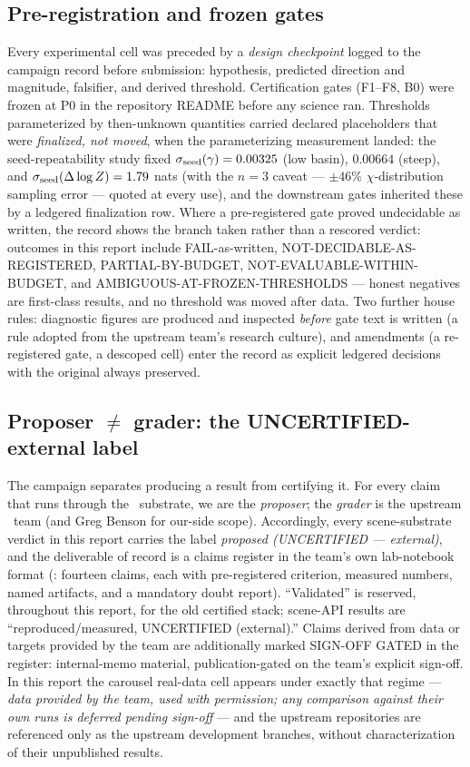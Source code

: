 \subsection{Pre-registration and frozen gates}

Every experimental cell was preceded by a \emph{design checkpoint} logged
to the campaign record before submission: hypothesis, predicted direction
and magnitude, falsifier, and derived threshold. Certification gates
(F1--F8, B0) were frozen at P0 in the repository README before any
science ran. Thresholds parameterized by then-unknown quantities carried
declared placeholders that were \emph{finalized, not moved}, when the
parameterizing measurement landed: the seed-repeatability study fixed
$\sigma_{\mathrm{seed}}(\gamma)=0.00325$ (low basin), $0.00664$ (steep), and
$\sigma_{\mathrm{seed}}(\Delta\log Z)=1.79$ nats (with the $n{=}3$ caveat --- $\pm46\%$
$\chi$-distribution sampling error --- quoted at every use), and the
downstream gates inherited these by a ledgered finalization
row. Where a pre-registered gate
proved undecidable as written, the record shows the branch taken rather
than a rescored verdict: outcomes in this report include
FAIL-as-written, NOT-DECIDABLE-AS-REGISTERED, PARTIAL-BY-BUDGET,
NOT-EVALUABLE-WITHIN-BUDGET, and AMBIGUOUS-AT-FROZEN-THRESHOLDS ---
honest negatives are first-class results, and no threshold was moved
after data. Two further house rules: diagnostic figures are produced and
inspected \emph{before} gate text is written (a rule adopted from the
upstream team's research culture), and amendments (a re-registered gate,
a descoped cell) enter the record as explicit ledgered decisions with the
original always preserved.

\subsection{Proposer $\ne$ grader: the UNCERTIFIED-external label}

The campaign separates producing a result from certifying it. For every
claim that runs through the \sceneapi\ substrate, we are the
\emph{proposer}; the \emph{grader} is the upstream \gigalens\ team (and
Greg Benson for our-side scope). Accordingly, every scene-substrate
verdict in this report carries the label \emph{proposed (UNCERTIFIED ---
external)}, and the deliverable of record is a claims register in the
team's own lab-notebook format
(: fourteen claims, each with
pre-registered criterion, measured numbers, named artifacts, and a
mandatory doubt report). ``Validated'' is reserved, throughout this
report, for the old certified stack; scene-API results are
``reproduced/measured, UNCERTIFIED (external).'' Claims derived from data
or targets provided by the team are additionally marked SIGN-OFF GATED in
the register: internal-memo material, publication-gated on the team's
explicit sign-off. In this report the carousel real-data cell appears
under exactly that regime --- \emph{data provided by the team, used with
permission; any comparison against their own runs is deferred pending
sign-off} --- and the upstream repositories are referenced only as the
upstream development branches, without characterization of their
unpublished results.

